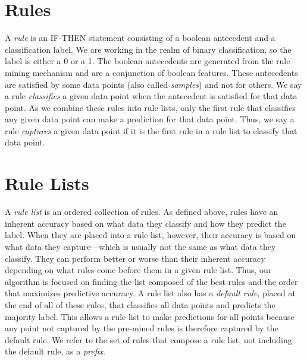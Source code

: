 \documentclass[]{report}
\theoremstyle{definition}
\begin{document}
\section{Rules}
A \textit{rule} is an IF-THEN statement consisting of a boolean antecedent and a classification label.
We are working in the realm of binary classification, so the label is either a 0 or a 1.
The boolean antecedents are generated from the rule mining mechanism and are a conjunction of boolean features.
These antecedents are satisfied by some data points (also called \textit{samples}) and not for others.
We say a rule \textit{classifies} a given data point when the antecedent is satisfied for that data point.
As we combine these rules into rule lists, only the first rule that classifies any given data point can make a prediction for that data point.
Thus, we say a rule \textit{captures} a given data point if it is the first rule in a rule list to classify that data point.

\section{Rule Lists}
A \textit{rule list} is an ordered collection of rules.
As defined above, rules have an inherent accuracy based on what data they classify and how they predict the label.
When they are placed into a rule list, however, their accuracy is based on what data they capture---which is usually not the same as what data they classify.
They can perform better or worse than their inherent accuracy depending on what rules come before them in a given rule list.
Thus, our algorithm is focused on finding the list composed of the best rules and the order that maximizes predictive accuracy.
A rule list also has a \textit{default rule}, placed at the end of all of these rules, that classifies all data points and predicts the majority label.
This allows a rule list to make predictions for all points because any point not captured by the pre-mined rules is therefore captured by the default rule.
We refer to the set of rules that compose a rule list, not including the default rule, as a \textit{prefix}.
\end{document}
